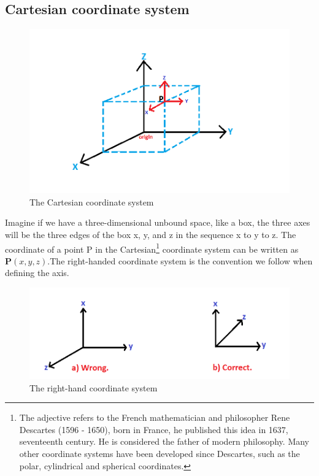 \subsection{Cartesian coordinate system}
\begin{figure}[h]
\centering
\includegraphics[width=1\linewidth]{./graphics/cartesian}
\caption{The Cartesian  coordinate system}
\end{figure}

Imagine if we have a three-dimensional unbound space, like a box, the three axes will be the three edges of the box x, y, and z in the sequence x to y to z. The coordinate of a point P in the {Cartesian}\footnote{The adjective \textacutedbl refers to the French mathematician and philosopher Rene Descartes (1596 - 1650), born in France, he published this idea in 1637, seventeenth century. He is considered the father of modern philosophy. Many other coordinate systems have been developed since Descartes, such as the polar, cylindrical and spherical coordinates.} coordinate system can be written as $\boldsymbol{P}(x, y, z)$.The right-handed coordinate system is the convention we follow when defining the axis.
\begin{figure}[h]
\centering
\includegraphics[width=1\linewidth]{./graphics/righthand}
\caption{The right-hand coordinate system}
\end{figure}

